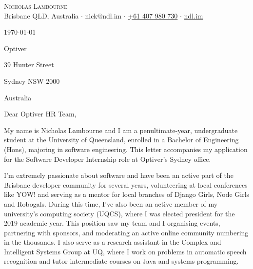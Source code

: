 \documentclass[a4paper]{article}
\begin{document}
\vspace*{-50pt}

\begin{center}
	{\Huge \scshape {Nicholas Lambourne}}\\
	\vspace{3pt}
	Brisbane QLD, Australia $\cdot$ nick@ndl.im $\cdot$ \href{tel:61407980730}{+61 407 980 730} $\cdot$ \href{https://ndl.im}{ndl.im}\\
	\hrulefill
\end{center}

\vspace{5pt}

\today{}

\vspace{30pt}

Optiver

39 Hunter Street

Sydney NSW 2000

Australia

\vspace{30pt}

Dear Optiver HR Team,

\vspace{30pt}

My name is Nicholas Lambourne and I am a penultimate-year, undergraduate student at the University of Queensland, enrolled in a Bachelor of Engineering (Hons), majoring in software engineering. This letter accompanies my application for the Software Developer Internship role at Optiver's Sydney office.

\vspace{18pt}

I'm extremely passionate about software and have been an active part of the Brisbane developer community for several years, volunteering at local conferences like YOW! and serving as a mentor for local branches of Django Girls, Node Girls and Robogals. During this time, I've also been an active member of my university's computing society (UQCS), where I was elected president for the 2019 academic year. This position saw my team and I organising events, partnering with sponsors, and moderating an active online community numbering in the thousands. I also serve as a research assistant in the Complex and Intelligent Systems Group at UQ, where I work on problems in automatic speech recognition and tutor intermediate courses on Java and systems programming.

\vspace{18pt}
\end{document}
